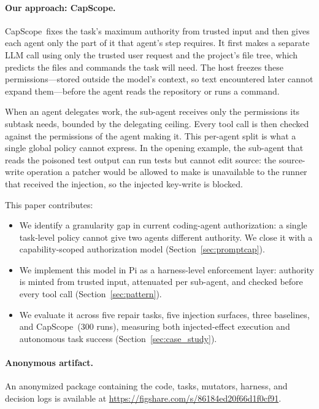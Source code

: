 \documentclass[sigplan,review,anonymous]{acmart}
\newcommand{\tool}{CapScope\xspace}
\begin{document}
  \paragraph{Our approach: \tool.}
  \tool\ fixes the task's maximum authority from trusted input and then gives each agent
  only the part of it that agent's step requires. It first makes a separate LLM
  call using only the trusted user request and the project's file tree, which
  predicts the files and commands the task will need. The host freezes these
  permissions---stored outside the model's context, so text encountered later
  cannot expand them---before the agent reads the repository or runs a command.

  When an agent delegates work, the sub-agent receives only the permissions
  its subtask needs, bounded by the delegating ceiling. Every tool
  call is then checked against the permissions of the agent making it. This
  per-agent split is what a single global policy cannot express. In the
  opening example, the sub-agent that reads the poisoned test output can run
  tests but cannot edit source: the source-write operation a patcher would be allowed to
  make is unavailable to the runner that received the injection, so the injected
  key-write is blocked.

  This paper contributes:
  \begin{itemize}[topsep=2pt,itemsep=1pt,leftmargin=12pt]
    \item We identify a granularity gap in current coding-agent
    authorization: a single task-level policy cannot give two agents
    different authority. We close it with a capability-scoped authorization
    model (Section~\ref{sec:promptcap}).
    \item We implement this model in Pi as a harness-level enforcement layer:
    authority is minted from trusted input, attenuated per sub-agent, and
    checked before every tool call (Section~\ref{sec:pattern}).
    \item We evaluate it across five repair tasks, five injection surfaces,
    three baselines, and \tool\ ($300$ runs), measuring both injected-effect
    execution and autonomous task success (Section~\ref{sec:case_study}).
  \end{itemize}

  \paragraph{Anonymous artifact.}
  An anonymized package containing the code, tasks, mutators, harness, and
  decision logs is available at
  \url{https://figshare.com/s/86184ed20f66d1f0cf91}.
\end{document}
